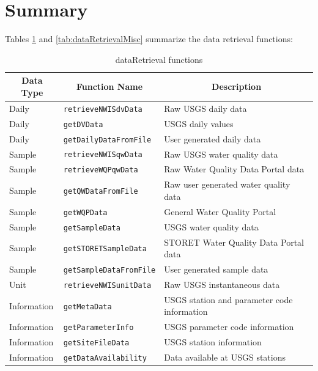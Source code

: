 \documentclass[a4paper,11pt]{article}\usepackage[]{graphicx}\usepackage[]{color}
\begin{document}
\FloatBarrier
\clearpage


\section{Summary}
\label{sec:summary}

Tables \ref{tab:dataRetrievalFunctions1} and \ref{tab:dataRetrievalMisc} summarize the data retrieval functions:

\begin{table}
{\footnotesize
  \begin{threeparttable}[b]
  \caption{dataRetrieval functions}
  \label{tab:dataRetrievalFunctions1}
\begin{tabular}{lll}
  \hline
\multicolumn{1}{c}{\textbf{\textsf{Data Type}}} &
\multicolumn{1}{c}{\textbf{\textsf{Function Name}}} &
\multicolumn{1}{c}{\textbf{\textsf{Description}}} \\ [0pt]
  \hline
  Daily & \texttt{retrieveNWISdvData} & Raw USGS daily data \\ 
  [5pt]Daily\tnote{1} & \texttt{getDVData} & USGS daily values \\ 
  [5pt]Daily\tnote{1} & \texttt{getDailyDataFromFile} & User generated daily data \\ 
  [5pt]Sample & \texttt{retrieveNWISqwData} & Raw USGS water quality data \\
  [5pt]Sample & \texttt{retrieveWQPqwData} & Raw Water Quality Data Portal data \\ 
  [5pt]Sample & \texttt{getQWDataFromFile} & Raw user generated water quality data \\ 
  [5pt]Sample & \texttt{getWQPData} & General Water Quality Portal\\
  [5pt]Sample\tnote{1} & \texttt{getSampleData} & USGS water quality data\\
  [5pt]Sample\tnote{1} & \texttt{getSTORETSampleData} & STORET Water Quality Data Portal data \\
  [5pt]Sample\tnote{1} & \texttt{getSampleDataFromFile} & User generated sample data \\ 
  [5pt]Unit & \texttt{retrieveNWISunitData} & Raw USGS instantaneous data \\
  [5pt]Information\tnote{1} & \texttt{getMetaData} & USGS station and parameter code information \\ 
  [5pt]Information & \texttt{getParameterInfo} & USGS parameter code information \\ 
  [5pt]Information & \texttt{getSiteFileData} & USGS station information \\ 
  [5pt]Information & \texttt{getDataAvailability} & Data available at USGS stations \\ 
   \hline
\end{tabular}


\end{threeparttable}}
\end{table}
\end{document}
